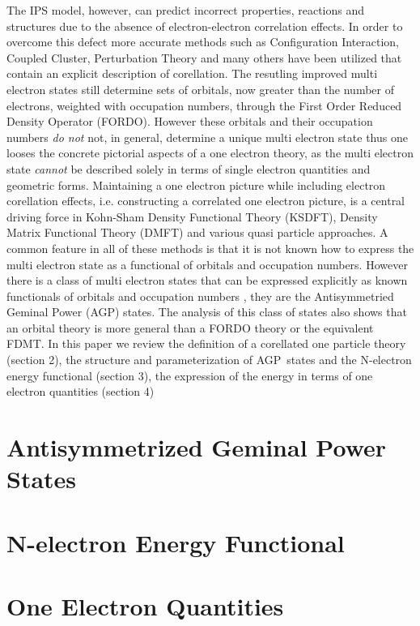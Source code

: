 \documentclass[aps,preprint]{revtex4}%
\begin{document}
The IPS model, however, can predict incorrect properties, reactions and
structures due to the absence of electron-electron correlation effects. In
order to overcome this defect more accurate methods such as Configuration
Interaction, Coupled Cluster, Perturbation Theory and many others have been
utilized that contain an explicit description of corellation. The resutling
improved multi electron states still determine sets of orbitals, now greater
than the number of electrons, weighted with occupation numbers, through the
First Order Reduced Density Operator (FORDO). However these orbitals and their
occupation numbers \emph{do not }not, in general, determine a unique multi
electron state thus one looses the concrete pictorial aspects of a one
electron theory, as the multi electron state \emph{cannot} be described solely
in terms of single electron quantities and geometric forms. 
Maintaining a one electron picture while including electron corellation
effects, i.e. constructing a correlated one electron picture, is a central
driving force in Kohn-Sham Density Functional Theory (KSDFT), Density Matrix
Functional Theory (DMFT) and various quasi particle approaches. A common
feature in all of these methods is that it is not known how to express the
multi electron state as a functional of orbitals and occupation numbers.
However there is a class of multi electron states that can be expressed
explicitly as known functionals of orbitals and occupation numbers
\cite{weiner_ortiz2005}, they are the Antisymmetried Geminal Power (AGP)
states. The analysis of this class of states also shows that an orbital theory
is more general than a FORDO theory or the equivalent FDMT. In this paper we
review the definition of a corellated one particle theory (section 2), the
structure and parameterization of AGP\ states and the N-electron energy
functional (section 3), the expression of the energy in terms of one electron
quantities (section 4)

\section{Antisymmetrized Geminal Power States\label{AGP States}}

\section{N-electron Energy Functional}

\section{One Electron Quantities}
\end{document}
